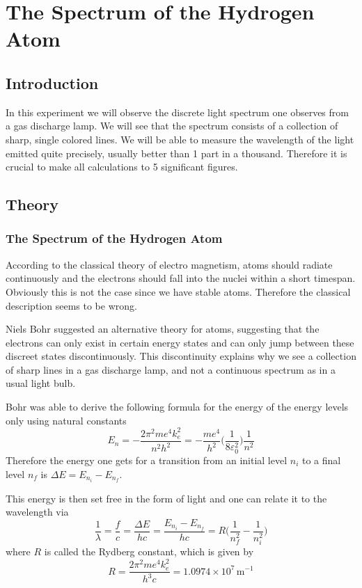 \chapter{The Spectrum of the Hydrogen Atom}
\section{Introduction}
In this experiment we will observe the discrete light spectrum one observes from a gas discharge lamp. We will see that the spectrum consists of a collection of sharp, single colored lines. We will be able to measure the wavelength of the light emitted quite precisely, usually better than 1 part in a thousand. Therefore it is crucial to make all calculations to 5 significant figures.

\section{Theory}
\subsection{The Spectrum of the Hydrogen Atom}
According to the classical theory of electro magnetism, atoms should radiate continuously and the electrons should fall into the nuclei within a short timespan. Obviously this is not the case since we have stable atoms. Therefore the classical description seems to be wrong. \myskip

Niels Bohr suggested an alternative theory for atoms, suggesting that the electrons can only exist in certain energy states and can only jump between these discreet states discontinuously. This discontinuity explains why we see a collection of sharp lines in a gas discharge lamp, and not a continuous spectrum as in a usual light bulb. \myskip

Bohr was able to derive the following formula for the energy of the energy levels only using natural constants
\begin{equation}
  E_{n}=-\frac{2\pi^2 me^4k^{2}_{e}}{n^2h^2}=-\frac{me^4}{h^2}\bigg(\frac{1}{8\varepsilon^{2}_{0}}\bigg)\frac{1}{n^2}
\end{equation}
Therefore the energy one gets for a transition from an initial level $n_i$ to a final level $n_f$ is $\Delta E = E_{n_{i}} - E_{n_{f}}$.\myskip 

This energy is then set free in the form of light and one can relate it to the wavelength via
\begin{equation}
  \frac{1}{\lambda}=\frac{f}{c}=\frac{\Delta E}{hc}=\frac{E_{n_{i}}-E_{n_{f}}}{hc}=R\bigg(\frac{1}{n^2_{f}}-\frac{1}{n^2_{i}}\bigg)
\label{eq:lambda}
\end{equation}
where $R$ is called the Rydberg constant, which is given by
\begin{equation}
  R=\frac{2\pi^2me^4k^2_{e}}{h^3c}=1.0974\times 10^{7}\, \mathrm{m}^{-1}
\end{equation}

